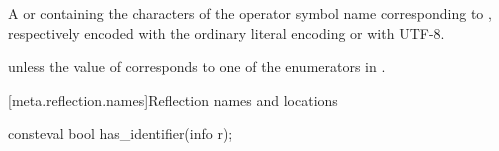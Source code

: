 \begin{itemdescr}
\pnum
\returns
A  or 
containing the characters of the operator symbol name corresponding to ,
respectively encoded with the ordinary literal encoding or with UTF-8.

\pnum
\throws
{} unless
the value of  corresponds to one of the enumerators in .
\end{itemdescr}

[meta.reflection.names]{Reflection names and locations}

%
\begin{itemdecl}
consteval bool has_identifier(info r);
\end{itemdecl}

